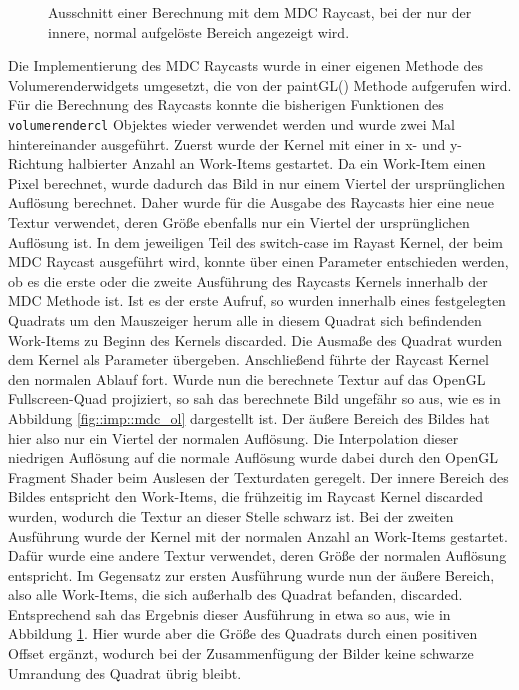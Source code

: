 \begin{figure}[]
\begin{minipage}[t]{0.49\textwidth}
		\caption{Ausschnitt einer Berechnung mit dem MDC Raycast, bei der nur der innere, normal aufgelöste Bereich angezeigt wird.}
		\label{fig::imp::mdc_il}
	\end{minipage}
\end{figure}

Die Implementierung des MDC Raycasts wurde in einer eigenen Methode des Volumerenderwidgets umgesetzt, die von der paintGL() Methode aufgerufen wird.
Für die Berechnung des Raycasts konnte die bisherigen Funktionen des \texttt{volumerendercl} Objektes wieder verwendet werden und wurde zwei Mal hintereinander ausgeführt.
Zuerst wurde der Kernel mit einer in x- und y-Richtung halbierter Anzahl an Work-Items gestartet.
Da ein Work-Item einen Pixel berechnet, wurde dadurch das Bild in nur einem Viertel der ursprünglichen Auflösung berechnet.
Daher wurde für die Ausgabe des Raycasts hier eine neue Textur verwendet, deren Größe ebenfalls nur ein Viertel der ursprünglichen Auflösung ist.
In dem jeweiligen Teil des switch-case im Rayast Kernel, der beim MDC Raycast ausgeführt wird, konnte über einen Parameter entschieden werden, ob es die erste oder die zweite Ausführung des Raycasts Kernels innerhalb der MDC Methode ist.
Ist es der erste Aufruf, so wurden innerhalb eines festgelegten Quadrats um den Mauszeiger herum alle in diesem Quadrat sich befindenden Work-Items zu Beginn des Kernels discarded.
Die Ausmaße des Quadrat wurden dem Kernel als Parameter übergeben.
Anschließend führte der Raycast Kernel den normalen Ablauf fort.
Wurde nun die berechnete Textur auf das OpenGL Fullscreen-Quad projiziert, so sah das berechnete Bild ungefähr so aus, wie es in Abbildung \ref{fig::imp::mdc_ol} dargestellt ist.
Der äußere Bereich des Bildes hat hier also nur ein Viertel der normalen Auflösung.
Die Interpolation dieser niedrigen Auflösung auf die normale Auflösung wurde dabei durch den OpenGL Fragment Shader beim Auslesen der Texturdaten geregelt.
Der innere Bereich des Bildes entspricht den Work-Items, die frühzeitig im Raycast Kernel discarded wurden, wodurch die Textur an dieser Stelle schwarz ist.
Bei der zweiten Ausführung wurde der Kernel mit der normalen Anzahl an Work-Items gestartet.
Dafür wurde eine andere Textur verwendet, deren Größe der normalen Auflösung entspricht.
Im Gegensatz zur ersten Ausführung wurde nun der äußere Bereich, also alle Work-Items, die sich außerhalb des Quadrat befanden, discarded.
Entsprechend sah das Ergebnis dieser Ausführung in etwa so aus, wie in Abbildung \ref{fig::imp::mdc_il}.
Hier wurde aber die Größe des Quadrats durch einen positiven Offset ergänzt, wodurch bei der Zusammenfügung der Bilder keine schwarze Umrandung des Quadrat übrig bleibt.

